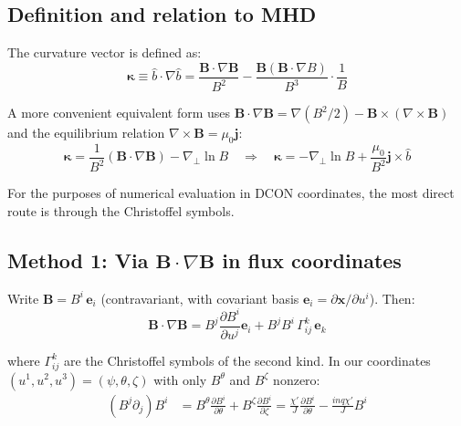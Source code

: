 \documentclass[12pt,a4paper]{article}
\begin{document}
\subsection{Definition and relation to MHD}

The curvature vector is defined as:
\begin{equation}
    \bm{\kappa} \equiv \hat{b}\cdot\nabla\hat{b} = \frac{\mathbf{B}\cdot\nabla\mathbf{B}}{B^2} - \frac{\mathbf{B}(\mathbf{B}\cdot\nabla B)}{B^3}\cdot\frac{1}{B}
    \label{eq:kappa_def}
\end{equation}

A more convenient equivalent form uses $\mathbf{B}\cdot\nabla\mathbf{B} = \nabla(B^2/2) - \mathbf{B}\times(\nabla\times\mathbf{B})$ and the equilibrium relation $\nabla\times\mathbf{B} = \mu_0\mathbf{j}$:
\begin{equation}
    \bm{\kappa} = \frac{1}{B^2}\!\left(\mathbf{B}\cdot\nabla\mathbf{B}\right) - \nabla_\perp\!\ln B
    \quad\Longrightarrow\quad
    \bm{\kappa} = -\nabla_\perp\!\ln B + \frac{\mu_0}{B^2}\mathbf{j}\times\hat{b}
    \label{eq:kappa_equiv}
\end{equation}

For the purposes of numerical evaluation in DCON coordinates, the most direct route is through the Christoffel symbols.

\subsection{Method 1: Via $\mathbf{B}\cdot\nabla\mathbf{B}$ in flux coordinates}

Write $\mathbf{B} = B^i\,\mathbf{e}_i$ (contravariant, with covariant basis $\mathbf{e}_i = \partial\mathbf{x}/\partial u^i$). Then:
\begin{equation}
    \mathbf{B}\cdot\nabla\mathbf{B} = B^j\frac{\partial B^i}{\partial u^j}\mathbf{e}_i + B^j B^i\,\Gamma^k_{ij}\,\mathbf{e}_k
    \label{eq:BdotgradB}
\end{equation}

where $\Gamma^k_{ij}$ are the Christoffel symbols of the second kind. In our coordinates $(u^1,u^2,u^3) = (\psi,\theta,\zeta)$ with only $B^\theta$ and $B^\zeta$ nonzero:
\begin{align}
    (B^j\partial_j)B^i &= B^\theta\frac{\partial B^i}{\partial\theta} + B^\zeta\frac{\partial B^i}{\partial\zeta}
    = \frac{\chi'}{J}\frac{\partial B^i}{\partial\theta} - \frac{inq\chi'}{J}B^i
    \label{eq:BdBcontra}
\end{align}
\end{document}
